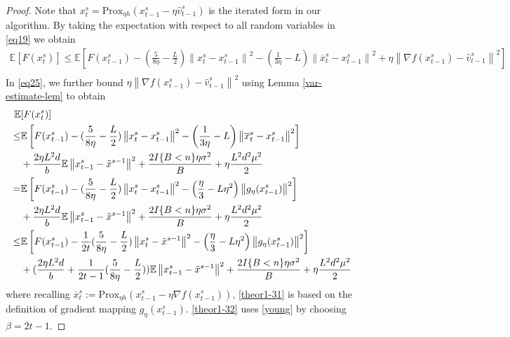 \documentclass{article}
\newcommand*{\Po}{\text{Prox}}
\newcommand*{\E}{\mathbb{E}}
\newcommand{\norm}[1]{\left\lVert#1\right\rVert}
\theoremstyle{definition}
\theoremstyle{remark}
\begin{document}
\begin{proof}
Note that $x_t^s = \Po_{\eta h}(x_{t-1}^s - \eta \hat{v}_{t-1}^s)$ is the iterated form in our algorithm.  By taking the expectation with respect to all random variables in \eqref{eq19} we obtain
 \begin{equation}\label{eq25}
 \begin{split} 
\E[F({x}_{t}^s)] \leq \E\left[F({x}_{t-1}^s)  -(\frac{5}{8\eta} - \frac{L}{2})\norm{{x}_t^s-x_{t-1}^s}^2- \left(\frac{1}{3\eta}-L\right)\norm{\overline{x}_t^s-x_{t-1}^s}^2+\eta \norm{\nabla f(x_{t-1}^s)-\hat{v}_{t-1}^s}^2\right]\\
 \end{split}
 \end{equation}
In \eqref{eq25}, we further bound $\eta \norm{\nabla f(x_{t-1}^s)-\hat{v}_{t-1}^s}^2$ using Lemma \ref{var-estimate-lem} to obtain
 \begin{align} 
\E&[F({x}_{t}^s)] \notag
\notag
\\ \leq& \E\left[F({x}_{t-1}^s)  -(\frac{5}{8\eta} - \frac{L}{2})\norm{{x}_t^s-x_{t-1}^s}^2- \left(\frac{1}{3\eta}-L\right)\norm{\overline{x}_t^s-x_{t-1}^s}^2\right]\notag\\
&+ \frac{2\eta L^2 d}{b}\E\norm{x_{t-1}^s-\tilde{x}^{s-1}}^2 + \frac{2I\{B < n\}\eta \sigma ^2}{B}+\eta \frac{L^2 d^2 \mu^2}{2}\notag
\\ =& \E\left[F({x}_{t-1}^s)  -(\frac{5}{8\eta} - \frac{L}{2})\norm{{x}_t^s-x_{t-1}^s}^2- \left(\frac{\eta}{3}-L\eta^2\right)\norm{g_{\eta}(x_{t-1}^s)}^2\right]\notag
\\&+\frac{2\eta L^2 d}{b}\E\norm{x_{t-1}^s-\tilde{x}^{s-1}}^2+ \frac{2I\{B < n\}\eta \sigma ^2}{B}+\eta \frac{L^2 d^2 \mu^2}{2}\label{theor1-31}
\\ \leq& \E\left[F({x}_{t-1}^s)  -\frac{1}{2t}(\frac{5}{8\eta} - \frac{L}{2})\norm{{x}_t^s-\tilde{x}^{s-1}}^2- \left(\frac{\eta}{3}-L\eta^2\right)\norm{g_{\eta}(x_{t-1}^s)}^2\right]\notag\\
&+(\frac{2\eta L^2 d}{b}+\frac{1}{2t-1}(\frac{5}{8\eta} - \frac{L}{2}))\E\norm{x_{t-1}^s-\tilde{x}^{s-1}}^2
+ \frac{2I\{B < n\}\eta \sigma ^2}{B}+\eta \frac{L^2 d^2 \mu^2}{2}\label{theor1-32}
 \end{align}
where recalling $\overline{x}_t^s := \Po_{\eta h}(x_{t-1}^s - \eta \nabla f(x_{t-1}^s))$, \eqref{theor1-31}  is based on the definition of gradient mapping $g_{\eta}(x_{t-1}^s)$. \eqref{theor1-32} uses \eqref{young} by choosing $\beta = 2t-1$.
 

\end{proof}
\end{document}
